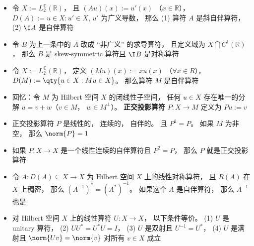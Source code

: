 \begin{itemize}
\item 令 $X := L_2^{\mathbb C}(\mathbb R)$， 且 $(Au)(x) := u'(x)$ （$x \in \mathbb R$）， $D(A) := {u\in X: u'\in X}$, $u'$ 为广义导数， 那么 (1) 算符 $A$ 是斜自伴算符， (2) $\I A$ 是自伴算符

\item 令 $B$ 为上一条中的 $A$ 改成 “非广义” 的求导算符， 且定义域为 $X \bigcap C^1(\mathbb R)$， 那么 $B$ 是 skew-symmetric 算符且 $\I B$ 是对称算符

\item 令 $X := L_2^{\mathbb C}(\mathbb R)$， 定义 $(Mu)(x) := xu(x)$ （$\forall x\in R$）， $D(M) := \qty{u\in X: Mu\in X}$。 那么算符 $M$ 是自伴算符

\item 回忆：令 $M$ 为 Hilbert 空间 $X$ 的闭线性子空间， 任何 $u\in X$ 存在唯一的分解 $u = v+w$（$v\in M$， $w \in M^\bot$）。 \textbf{正交投影算符} $P:X\to M$ 定义为 $Pu := v$

\item 正交投影算符 $P$ 是线性的， 连续的， 自伴的。 且 $P^2 = P$。 如果 $M$ 为非空， 那么 $\norm{P} = 1$

\item 如果 $P:X\to X$ 是一个线性连续的自伴算符且 $P^2 = P$， 那么 $P$ 就是正交投影算符

\item 令 $A:D(A)\subseteq X\to X$ 为 Hilbert 空间 $X$ 上的线性对称算符， 且 $R(A)$ 在 $X$ 上稠密， 那么 $(A^{-1})^* = (A^*)^{-1}$。 如果这个 $A$ 是自伴算符， 那么 $A^{-1}$ 也是

\item 对 Hilbert 空间 $X$ 上的线性算符 $U:X\to X$， 以下条件等价。 (1) $U$ 是 unitary 算符， (2) $UU^* = U^*U = I$， (3) $U$ 是双射且 $U^{-1} = U^*$， (4) $U$ 是满射且 $\norm{Uv} = \norm{v}$ 对所有 $v\in X$ 成立
\end{itemize}

